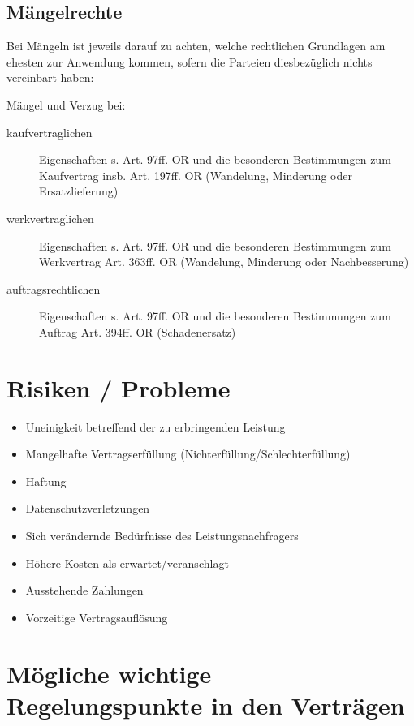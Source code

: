 \subsection{Mängelrechte}

Bei Mängeln ist jeweils darauf zu achten, welche rechtlichen Grundlagen am ehesten zur Anwendung kommen, sofern die Parteien diesbezüglich nichts vereinbart haben:

Mängel und Verzug bei:
\begin{description}
  \item[kaufvertraglichen] Eigenschaften s. Art. 97ff. OR und die besonderen
  Bestimmungen zum Kaufvertrag insb. Art. 197ff. OR (Wandelung, Minderung
  oder Ersatzlieferung)
  \item[werkvertraglichen] Eigenschaften s. Art. 97ff. OR und die besonderen
  Bestimmungen zum Werkvertrag Art. 363ff. OR (Wandelung, Minderung oder
  Nachbesserung)
  \item[auftragsrechtlichen] Eigenschaften s. Art. 97ff. OR und die besonderen
  Bestimmungen zum Auftrag Art. 394ff. OR (Schadenersatz)
\end{description}

\section{Risiken / Probleme}

\begin{itemize}
  \item Uneinigkeit betreffend der zu erbringenden Leistung
  \item Mangelhafte Vertragserfüllung (Nichterfüllung/Schlechterfüllung)
  \item Haftung
  \item Datenschutzverletzungen
  \item Sich verändernde Bedürfnisse des Leistungsnachfragers
  \item Höhere Kosten als erwartet/veranschlagt
  \item Ausstehende Zahlungen
  \item Vorzeitige Vertragsauflösung
\end{itemize}

\section{Mögliche wichtige Regelungspunkte in den Verträgen}

